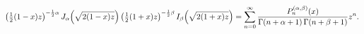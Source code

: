 \[\left(\tfrac{1}{2}(1-x)z\right)^{-\frac{1}{2}\alpha}\mathop{J_{\alpha}\/}%
\nolimits\!\left(\sqrt{2(1-x)z}\right)\*\left(\tfrac{1}{2}(1+x)z\right)^{-%
\frac{1}{2}\beta}\mathop{I_{\beta}\/}\nolimits\!\left(\sqrt{2(1+x)z}\right)=%
\sum_{n=0}^{\infty}\frac{\mathop{P^{(\alpha,\beta)}_{n}\/}\nolimits\!\left(x%
\right)}{\mathop{\Gamma\/}\nolimits\!\left(n+\alpha+1\right)\mathop{\Gamma\/}%
\nolimits\!\left(n+\beta+1\right)}z^{n}.\]
